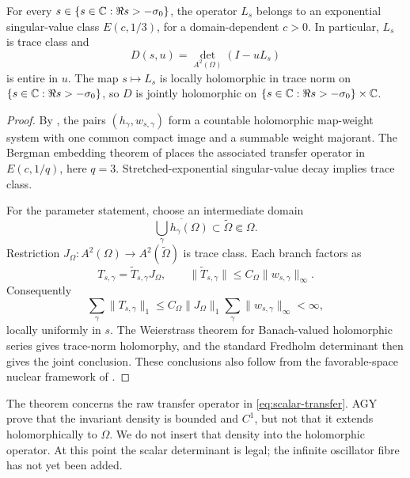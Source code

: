 \begin{theorem}
\label{thm:scalar-trace-class}
For every \(s\in\{s\in\mathbb{C}:\Re s>-\sigma_0\}\), the operator \(L_s\) belongs to an
exponential singular-value class \(E(c,1/3)\), for a domain-dependent
\(c>0\).  In particular, \(L_s\) is trace class and
\begin{equation}
 D(s,u)=\det_{A^2(\Omega)}(I-uL_s)
 \label{eq:scalar-determinant}
\end{equation}
is entire in \(u\).  The map
\(s\mapsto L_s\) is locally holomorphic in trace norm on
\(\{s\in\mathbb{C}:\Re s>-\sigma_0\}\), so \(D\) is jointly holomorphic on
\(\{s\in\mathbb{C}:\Re s>-\sigma_0\}\times\mathbb{C}\).
\end{theorem}

\begin{proof}
By , the pairs
\((h_\gamma,w_{s,\gamma})\) form a countable holomorphic map-weight system
with one common compact image and a summable weight majorant.  The Bergman
embedding theorem of \citet{bandtlow2008explicit} places the associated
transfer operator in \(E(c,1/q)\), here \(q=3\).  Stretched-exponential
singular-value decay implies trace class.

For the parameter statement, choose an intermediate domain
\begin{equation}
 \overline{\bigcup_\gamma h_\gamma(\Omega)}
 \subset\widetilde\Omega\Subset\Omega.
 \label{eq:intermediate-domain}
\end{equation}
Restriction
\(J_\Omega:A^2(\Omega)\to A^2(\widetilde\Omega)\) is trace class.  Each
branch factors as
\[
 T_{s,\gamma}=\widetilde T_{s,\gamma}J_\Omega,
 \qquad
 \|\widetilde T_{s,\gamma}\|
 \leq C_\Omega\|w_{s,\gamma}\|_\infty.
\]
Consequently
\begin{equation}
 \sum_\gamma\|T_{s,\gamma}\|_1
 \leq C_\Omega\|J_\Omega\|_1
 \sum_\gamma\|w_{s,\gamma}\|_\infty<\infty,
 \label{eq:branch-trace-norm}
\end{equation}
locally uniformly in \(s\).  The Weierstrass theorem for Banach-valued
holomorphic series gives trace-norm holomorphy, and the standard Fredholm
determinant then gives the joint conclusion.  These conclusions also follow
from the favorable-space nuclear framework of
\citet{bandtlow2008ruelle}.
\end{proof}

The theorem concerns the raw transfer operator in
\eqref{eq:scalar-transfer}.  AGY prove that the invariant density is bounded
and \(C^1\), but not that it extends holomorphically to \(\Omega\).  We do
not insert that density into the holomorphic operator.  At this point the
scalar determinant is legal; the infinite oscillator fibre has not yet been
added.
